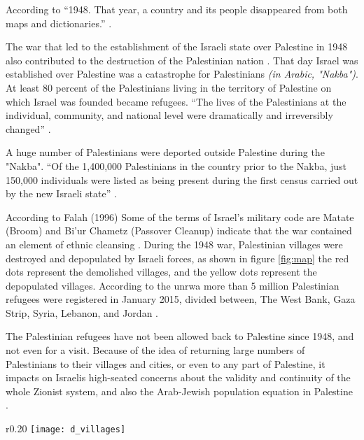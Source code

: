  According to \cite{Sanbar2007} “1948. That year, a country and its people disappeared from both maps and dictionaries.” \citep{Sanbar2007}. 



The war that led to the establishment of the Israeli state over Palestine in 1948 also contributed to the destruction of the Palestinian nation \citep{Sadi2007}. That day Israel was established over Palestine was a catastrophe for Palestinians \textit{(in Arabic, "Nakba")}. At least 80 percent of the Palestinians living in the territory of Palestine on which Israel was founded became refugees. “The lives of the Palestinians at the individual, community, and national level were dramatically and irreversibly changed” \citep{Sadi2007}.

A huge number of Palestinians were deported outside Palestine during the "Nakba". “Of the
1,400,000 Palestinians in the country prior to the Nakba, just 150,000 individuals were listed
as being present during the first census carried out by the new Israeli state” \citep{Sanbar2007}.



According to Falah (1996) Some of the terms of Israel's military code are Matate (Broom) and Bi'ur Chametz (Passover Cleanup) indicate that the war contained an element of ethnic cleansing \citep{Falah1996, Pappe2006}. During the 1948 war, Palestinian villages were destroyed and depopulated by Israeli forces, as shown in figure \ref{fig:map} the red dots represent the demolished villages, and the yellow dots represent the depopulated villages. 
According to the \acrshort{unrwa} more than 5 million Palestinian refugees were registered in January 2015, divided between, The West Bank, Gaza
Strip, Syria, Lebanon, and Jordan \citep{Khalidi2015, DajaniDaoudi2011}. 

The Palestinian refugees have not been allowed back to Palestine since 1948, and not even for a visit. Because of the idea of returning large numbers of Palestinians to their villages and cities, or even to any part of Palestine, it impacts on Israelis high-seated concerns about the validity and continuity of the whole Zionist system, and also the Arab-Jewish population equation in Palestine \citep{Khalidi2016}.

\begin{wrapfigure}{r}{0.20\textwidth} %
    \centering
    \texttt{[image: d\_villages]}
    \caption{Demolished and depopulated villages - Palestine Open Maps, © 2018  Visualizing Palestine}
    \label{fig:map}
\end{wrapfigure} 

